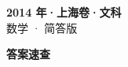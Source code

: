\documentclass[zihao=-4, a4paper]{ctexart}
\begin{document}
\begin{center}
  {\Large\bfseries 2014 年·上海卷·文科}\\[4pt]
  {\large 数学 · 简答版}
\end{center}
\medskip
{}

\clearpage
{}
\begin{center}{\Large\bfseries 答案速查}\end{center}
\medskip

\end{document}

